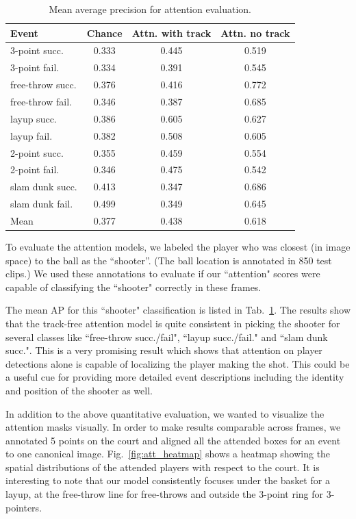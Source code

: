 \begin{table}[ht!]
\begin{center}
\small
 \begin{tabular}{|l|c|c|c|}
  \hline
Event            & Chance & Attn. with track & Attn. no track \\ \hline \hline
3-point succ.    & 0.333 & 0.445 & 0.519 \\ 
3-point fail.    & 0.334 & 0.391 & 0.545 \\ 
free-throw succ. & 0.376 & 0.416 & 0.772 \\ 
free-throw fail. & 0.346 & 0.387 & 0.685 \\  
layup succ.      & 0.386 & 0.605 & 0.627 \\ 
layup fail.      & 0.382 & 0.508 & 0.605 \\ 
2-point succ.    & 0.355 & 0.459 & 0.554 \\ 
2-point fail.    & 0.346 & 0.475 & 0.542 \\ 
slam dunk succ.  & 0.413 & 0.347 & 0.686 \\ 
slam dunk fail.  & 0.499 & 0.349 & 0.645 \\ \hline \hline  
Mean             & 0.377 & 0.438 & 0.618 \\ \hline
  \end{tabular}
\end{center}
  \caption{Mean average precision for attention evaluation.}
  \label{tab:attention_res}
\end{table}

To evaluate the attention models, we  labeled the player who was
closest (in image space) to the ball as the ``shooter''.
(The ball location is annotated in 850 test clips.)
We used these annotations to evaluate if our ``attention" scores
were capable of classifying the ``shooter" correctly in these frames.

The mean AP for this ``shooter"  classification is listed
in Tab.~\ref{tab:attention_res}.
The results show that the track-free attention model is quite consistent in picking
the shooter for several classes like ``free-throw succ./fail",
``layup succ./fail." and ``slam dunk succ.". This is a very
promising result which shows that attention on player detections
alone is capable of localizing the player making the shot. This could be
a useful cue for providing more detailed event descriptions
including the identity and position of the shooter as well.

In addition to the above quantitative evaluation, we wanted to
visualize the attention masks visually.
In order to make results comparable across frames, 
we annotated 5 points on the court and
aligned all the attended boxes for an event to one canonical image. 
Fig.~\ref{fig:att_heatmap} shows a heatmap  showing the spatial distributions
of the attended players with respect to the court. It is interesting to note that
our model consistently focuses under the basket for a layup, at the free-throw
line for free-throws and outside the 3-point ring for 3-pointers.

